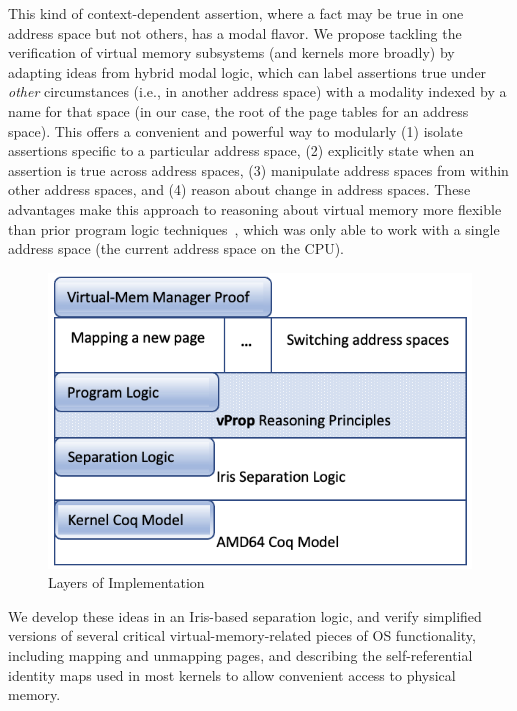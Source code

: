 This kind of context-dependent assertion, where a fact may be true in one address space but not others, has a modal flavor. 
We propose tackling the verification of virtual memory subsystems (and kernels more broadly) by adapting ideas from hybrid modal logic, which can label assertions true under \emph{other} circumstances (i.e., in another address space) with a modality indexed by a name for that space (in our case, the root of the page tables for an address space). This offers a convenient and powerful way to modularly (1) isolate assertions specific to a particular address space, (2) explicitly state when an assertion is true across address spaces, (3) manipulate address spaces from within other address spaces, and (4) reason about change in address spaces. These advantages make this approach to reasoning about virtual memory more flexible than prior program logic techniques~\cite{kolanski08vstte,kolanski09tphols}, which was only able to work with a single address space (the current address space on the CPU).

\begin{figure}
   \includegraphics[width=0.5\columnwidth]{architecture.png}
  \caption{Layers of Implementation}
  \label{fig:architecture}
  \end{figure}
We develop these ideas in an Iris-based separation logic, and verify simplified versions of several critical virtual-memory-related pieces of OS functionality, including mapping and unmapping pages, and describing the self-referential identity maps used in most kernels to allow convenient access to physical memory. 
